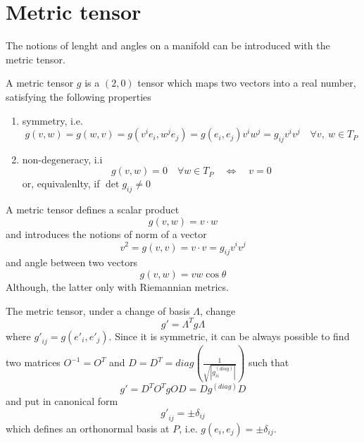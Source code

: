 \section{Metric tensor}

    The notions of lenght and angles on a manifold can be introduced with the metric tensor.

    A metric tensor $g$ is a $(2,0)$ tensor which maps two vectors into a real number, satisfying the following properties
    \begin{enumerate}
        \item symmetry, i.e.
            \begin{equation*}
                g(v,w) = g(w, v) = g(v^i e_i, w^j e_j) = g(e_i, e_j) v^i w^j = g_{ij} v^i v^j \quad \forall v, ~w \in T_P
            \end{equation*}
        \item non-degeneracy, i.i 
            \begin{equation*}
                g(v, w) = 0 \quad \forall w \in T_P \quad \iff \quad v=0 
            \end{equation*}
            or, equivalenlty, if $\det g_{ij} \neq 0$
    \end{enumerate}

    A metric tensor defines a scalar product 
    \begin{equation*}
        g(v, w) = v \cdot w
    \end{equation*}
    and introduces the notions of norm of a vector 
    \begin{equation*}
        v^2 = g(v,v) = v \cdot v = g_{ij} v^i v^j
    \end{equation*}
    and angle between two vectors 
    \begin{equation*}
        g(v, w) = v w \cos \theta
    \end{equation*}
    Although, the latter only with Riemannian metrics.

    The metric tensor, under a change of basis $\Lambda$, change 
    \begin{equation*}
        g' = \Lambda^T g \Lambda
    \end{equation*}
    where ${g'}_{ij} = g({e'}_i, {e'}_j)$. Since it is symmetric, it can be always possible to find two matrices $O^{-1} = O^{T}$ and $D = D^T = diag(\frac{1}{\sqrt{|g_{ii}^{(diag)}|}})$ such that 
    \begin{equation*}
        g' = D^T O^T g O D = D g^{(diag)} D 
    \end{equation*} 
    and put in canonical form
    \begin{equation*}
        {g'}_{ij} = \pm \delta_{ij}
    \end{equation*}
    which defines an orthonormal basis at $P$, i.e. $g(e_i, e_j) = \pm \delta_{ij}$. 

